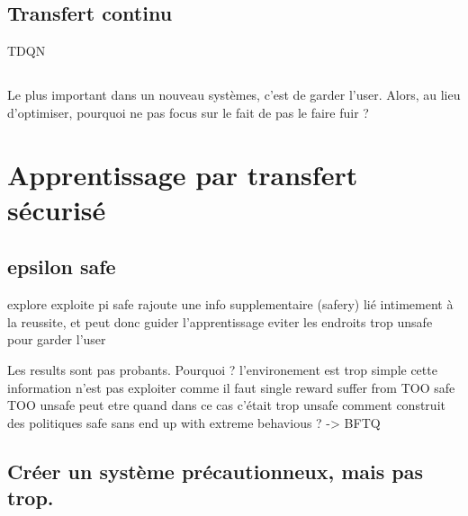\documentclass[french]{beamer}
\begin{document}
    \subsection{Transfert continu}

    \begin{frame}

        TDQN

    \end{frame}

    \subsection{}

    \begin{frame}
        Le plus important dans un nouveau systèmes, c'est de garder l'user. Alors, au lieu d'optimiser, pourquoi ne pas focus sur le fait de pas le faire fuir ?
    \end{frame}

    \section{Apprentissage par transfert sécurisé}

    \subsection{epsilon safe}
    \begin{frame}

        explore
        exploite
        pi safe
        rajoute une info supplementaire (safery) lié intimement à la reussite, et peut donc guider l'apprentissage
        eviter les endroits trop unsafe pour garder l'user
    \end{frame}

    \begin{frame}
        Les results sont pas probants.
        Pourquoi ?
        l'environement est trop simple
        cette information n'est pas exploiter comme il faut
        single reward suffer from TOO safe TOO unsafe
        peut etre quand dans ce cas c'était trop unsafe
        comment construit des politiques safe sans end up with extreme behavious ? -> BFTQ
    \end{frame}

    \subsection{Créer un système précautionneux, mais pas trop.}
\end{document}
